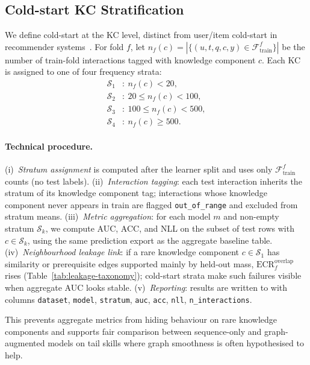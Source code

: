 \documentclass[runningheads]{llncs}
\newcommand{\KC}{knowledge component}
\newcommand{\KCs}{knowledge components}
\begin{document}
\subsection{Cold-start KC Stratification}
\label{sec:cold-start}
We define cold-start at the KC level, distinct from user/item
cold-start in recommender systems~\cite{schein2002coldstart}. For fold
$f$, let $n_f(c)=|\{(u,t,q,c,y)\in\mathcal{F}_{\text{train}}^f\}|$ be
the number of train-fold interactions tagged with \KC{} $c$. Each KC
is assigned to one of four frequency strata:
\[
\begin{aligned}
\mathcal{S}_1&:\ n_f(c)<20,\\
\mathcal{S}_2&:\ 20\le n_f(c)<100,\\
\mathcal{S}_3&:\ 100\le n_f(c)<500,\\
\mathcal{S}_4&:\ n_f(c)\ge 500.
\end{aligned}
\]
\paragraph{Technical procedure.}
(i)~\emph{Stratum assignment} is computed after the learner split and
uses only $\mathcal{F}_{\text{train}}^f$ counts (no test labels).
(ii)~\emph{Interaction tagging}: each test interaction inherits the
stratum of its \KC{} tag; interactions whose \KC{} never appears in train
are flagged \texttt{out\_of\_range} and excluded from stratum means.
(iii)~\emph{Metric aggregation}: for each model $m$ and non-empty stratum
$\mathcal{S}_k$, we compute AUC, ACC, and NLL on the subset of test
rows with $c\in\mathcal{S}_k$, using the same prediction export as the
aggregate baseline table.
(iv)~\emph{Neighbourhood leakage link}: if a rare \KC{} $c\in\mathcal{S}_1$
has similarity or prerequisite edges supported mainly by held-out mass,
$\mathrm{ECR}^{\mathrm{overlap}}_f$ rises (Table~\ref{tab:leakage-taxonomy});
cold-start strata make such failures visible when aggregate AUC looks stable.
(v)~\emph{Reporting}: results are written to
 with columns
\texttt{dataset}, \texttt{model}, \texttt{stratum}, \texttt{auc},
\texttt{acc}, \texttt{nll}, \texttt{n\_interactions}.

This prevents aggregate metrics from hiding behaviour on rare \KCs{} and
supports fair comparison between sequence-only and graph-augmented models
on tail skills where graph smoothness is often hypothesised to help.
\end{document}
